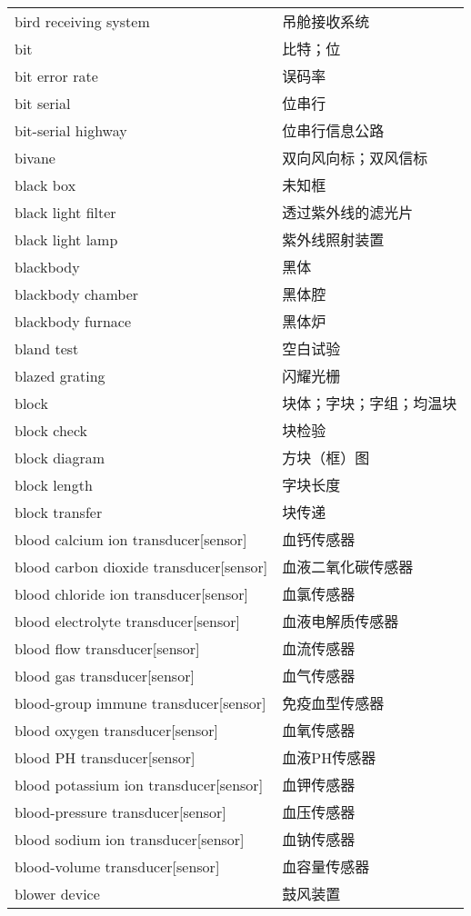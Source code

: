 \documentclass[
]{article}
\begin{document}
\begin{longtable}[]{@{}ll@{}}
bird receiving system & 吊舱接收系统 \\
bit & 比特；位 \\
bit error rate & 误码率 \\
bit serial & 位串行 \\
bit-serial highway & 位串行信息公路 \\
bivane & 双向风向标；双风信标 \\
black box & 未知框 \\
black light filter & 透过紫外线的滤光片 \\
black light lamp & 紫外线照射装置 \\
blackbody & 黑体 \\
blackbody chamber & 黑体腔 \\
blackbody furnace & 黑体炉 \\
bland test & 空白试验 \\
blazed grating & 闪耀光栅 \\
block & 块体；字块；字组；均温块 \\
block check & 块检验 \\
block diagram & 方块（框）图 \\
block length & 字块长度 \\
block transfer & 块传递 \\
blood calcium ion transducer{[}sensor{]} & 血钙传感器 \\
blood carbon dioxide transducer{[}sensor{]} & 血液二氧化碳传感器 \\
blood chloride ion transducer{[}sensor{]} & 血氯传感器 \\
blood electrolyte transducer{[}sensor{]} & 血液电解质传感器 \\
blood flow transducer{[}sensor{]} & 血流传感器 \\
blood gas transducer{[}sensor{]} & 血气传感器 \\
blood-group immune transducer{[}sensor{]} & 免疫血型传感器 \\
blood oxygen transducer{[}sensor{]} & 血氧传感器 \\
blood PH transducer{[}sensor{]} & 血液PH传感器 \\
blood potassium ion transducer{[}sensor{]} & 血钾传感器 \\
blood-pressure transducer{[}sensor{]} & 血压传感器 \\
blood sodium ion transducer{[}sensor{]} & 血钠传感器 \\
blood-volume transducer{[}sensor{]} & 血容量传感器 \\
blower device & 鼓风装置 \\

\end{longtable}
\end{document}
